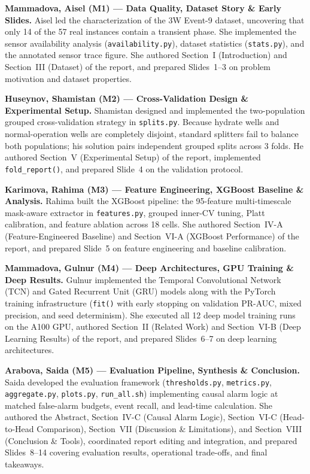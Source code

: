 \documentclass[11pt,a4paper]{article}
\begin{document}
\noindent\textbf{Mammadova, Aisel (M1) --- Data Quality, Dataset Story \& Early Slides.}
Aisel led the characterization of the 3W Event-9 dataset, uncovering that only 14 of the 57 real instances contain a transient phase. She implemented the sensor availability analysis (\texttt{availability.py}), dataset statistics (\texttt{stats.py}), and the annotated sensor trace figure. She authored Section~I (Introduction) and Section~III (Dataset) of the report, and prepared Slides~1--3 on problem motivation and dataset properties.

\medskip

\noindent\textbf{Huseynov, Shamistan (M2) --- Cross-Validation Design \& Experimental Setup.}
Shamistan designed and implemented the two-population grouped cross-validation strategy in \texttt{splits.py}. Because hydrate wells and normal-operation wells are completely disjoint, standard splitters fail to balance both populations; his solution pairs independent grouped splits across 3 folds. He authored Section~V (Experimental Setup) of the report, implemented \texttt{fold\_report()}, and prepared Slide~4 on the validation protocol.

\medskip

\noindent\textbf{Karimova, Rahima (M3) --- Feature Engineering, XGBoost Baseline \& Analysis.}
Rahima built the XGBoost pipeline: the 95-feature multi-timescale mask-aware extractor in \texttt{features.py}, grouped inner-CV tuning, Platt calibration, and feature ablation across 18 cells. She authored Section~IV-A (Feature-Engineered Baseline) and Section~VI-A (XGBoost Performance) of the report, and prepared Slide~5 on feature engineering and baseline calibration.

\medskip

\noindent\textbf{Mammadova, Gulnur (M4) --- Deep Architectures, GPU Training \& Deep Results.}
Gulnur implemented the Temporal Convolutional Network (TCN) and Gated Recurrent Unit (GRU) models along with the PyTorch training infrastructure (\texttt{fit()} with early stopping on validation PR-AUC, mixed precision, and seed determinism). She executed all 12 deep model training runs on the A100 GPU, authored Section~II (Related Work) and Section~VI-B (Deep Learning Results) of the report, and prepared Slides~6--7 on deep learning architectures.

\medskip

\noindent\textbf{Arabova, Saida (M5) --- Evaluation Pipeline, Synthesis \& Conclusion.}
Saida developed the evaluation framework (\texttt{thresholds.py}, \texttt{metrics.py}, \texttt{aggregate.py}, \texttt{plots.py}, \texttt{run\_all.sh}) implementing causal alarm logic at matched false-alarm budgets, event recall, and lead-time calculation. She authored the Abstract, Section~IV-C (Causal Alarm Logic), Section~VI-C (Head-to-Head Comparison), Section~VII (Discussion \& Limitations), and Section~VIII (Conclusion \& Tools), coordinated report editing and integration, and prepared Slides~8--14 covering evaluation results, operational trade-offs, and final takeaways.
\end{document}
